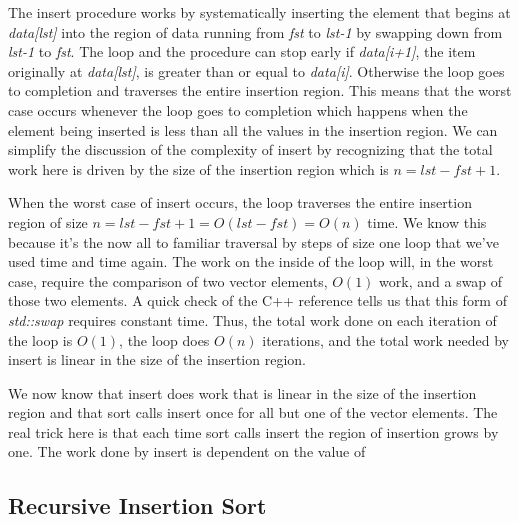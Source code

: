 \documentclass[]{tufte-handout}
\begin{document}
The insert procedure works by systematically inserting the element that begins at \textit{data[lst]} into the region of data running from \textit{fst} to \textit{lst-1} by swapping down from \textit{lst-1} to \textit{fst}. The loop and the procedure can stop early if \textit{data[i+1]}, the item originally at \textit{data[lst]}, is greater than or equal to \textit{data[i]}. Otherwise the loop goes to completion and traverses the entire insertion region. This means that the worst case occurs whenever the loop goes to completion which happens when the element being inserted is less than all the values in the insertion region. We can simplify the discussion of the complexity of insert by recognizing that the total work here is driven by the size of the insertion region which is $n=lst-fst+1$.

When the worst case of insert occurs, the loop traverses the entire insertion region of size $n=lst-fst+1=O(lst-fst)=O(n)$ time. We know this because it's the now all to familiar traversal by steps of size one loop that we've used time and time again. The work on the inside of the loop will, in the worst case, require the comparison of two vector elements, $O(1)$ work, and a swap of those two elements. A quick check of the C++ reference tells us that this form of \textit{std::swap} requires constant time. Thus, the total work done on each iteration of the loop is $O(1)$, the loop does $O(n)$ iterations, and the total work needed by insert is linear in the size of the insertion region.

We now know that insert does work that is linear in the size of the insertion region and that sort calls insert once for all but one of the vector elements. The real trick here is that each time sort calls insert the region of insertion grows by one. The work done by insert is dependent on the value of 

\subsection{Recursive Insertion Sort}
\end{document}
